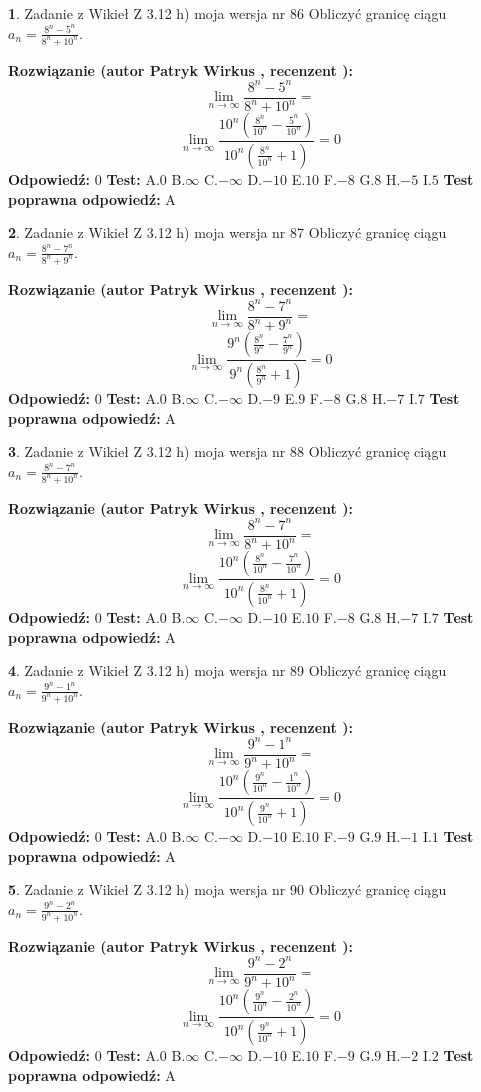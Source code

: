 \documentclass[12pt, a4paper]{article}
\theoremstyle{definition} %
\newtheorem{zad}{}
\newcommand{\zadStart}[1]{\begin{zad}#1\newline}
\newcommand{\zadStop}{\end{zad}}
\newcommand{\rozwStart}[2]{\noindent \textbf{Rozwiązanie (autor #1 , recenzent #2): }\newline}
\newcommand{\rozwStop}{\newline}
\newcommand{\odpStart}{\noindent \textbf{Odpowiedź:}\newline}
\newcommand{\odpStop}{\newline}
\newcommand{\testStart}{\noindent \textbf{Test:}\newline}
\newcommand{\testStop}{\newline}
\newcommand{\kluczStart}{\noindent \textbf{Test poprawna odpowiedź:}\newline}
\newcommand{\kluczStop}{\newline}
\begin{document}
\zadStart{Zadanie z Wikieł Z 3.12 h) moja wersja nr 86}
Obliczyć granicę ciągu $a_{n}=\frac{8^{n} - 5^{n}}{8^{n} + 10^{n}}$.
\zadStop
\rozwStart{Patryk Wirkus}{}
$$\lim\limits_{n\to\infty}\frac{8^{n} - 5^{n}}{8^{n} + 10^{n}}=$$
$$\lim\limits_{n\to\infty}\frac{10^{n}(\frac{8^{n}}{10^{n}} - \frac{5^{n}}{10^{n}})}{10^{n}(\frac{8^{n}}{10^{n}} + 1)} = 0$$
\rozwStop
\odpStart
$0$
\odpStop
\testStart
A.$0$
B.$\infty$
C.$-\infty$
D.$-10$
E.$10$
F.$-8$
G.$8$
H.$-5$
I.$5$
\testStop
\kluczStart
A
\kluczStop



\zadStart{Zadanie z Wikieł Z 3.12 h) moja wersja nr 87}
Obliczyć granicę ciągu $a_{n}=\frac{8^{n} - 7^{n}}{8^{n} + 9^{n}}$.
\zadStop
\rozwStart{Patryk Wirkus}{}
$$\lim\limits_{n\to\infty}\frac{8^{n} - 7^{n}}{8^{n} + 9^{n}}=$$
$$\lim\limits_{n\to\infty}\frac{9^{n}(\frac{8^{n}}{9^{n}} - \frac{7^{n}}{9^{n}})}{9^{n}(\frac{8^{n}}{9^{n}} + 1)} = 0$$
\rozwStop
\odpStart
$0$
\odpStop
\testStart
A.$0$
B.$\infty$
C.$-\infty$
D.$-9$
E.$9$
F.$-8$
G.$8$
H.$-7$
I.$7$
\testStop
\kluczStart
A
\kluczStop



\zadStart{Zadanie z Wikieł Z 3.12 h) moja wersja nr 88}
Obliczyć granicę ciągu $a_{n}=\frac{8^{n} - 7^{n}}{8^{n} + 10^{n}}$.
\zadStop
\rozwStart{Patryk Wirkus}{}
$$\lim\limits_{n\to\infty}\frac{8^{n} - 7^{n}}{8^{n} + 10^{n}}=$$
$$\lim\limits_{n\to\infty}\frac{10^{n}(\frac{8^{n}}{10^{n}} - \frac{7^{n}}{10^{n}})}{10^{n}(\frac{8^{n}}{10^{n}} + 1)} = 0$$
\rozwStop
\odpStart
$0$
\odpStop
\testStart
A.$0$
B.$\infty$
C.$-\infty$
D.$-10$
E.$10$
F.$-8$
G.$8$
H.$-7$
I.$7$
\testStop
\kluczStart
A
\kluczStop



\zadStart{Zadanie z Wikieł Z 3.12 h) moja wersja nr 89}
Obliczyć granicę ciągu $a_{n}=\frac{9^{n} - 1^{n}}{9^{n} + 10^{n}}$.
\zadStop
\rozwStart{Patryk Wirkus}{}
$$\lim\limits_{n\to\infty}\frac{9^{n} - 1^{n}}{9^{n} + 10^{n}}=$$
$$\lim\limits_{n\to\infty}\frac{10^{n}(\frac{9^{n}}{10^{n}} - \frac{1^{n}}{10^{n}})}{10^{n}(\frac{9^{n}}{10^{n}} + 1)} = 0$$
\rozwStop
\odpStart
$0$
\odpStop
\testStart
A.$0$
B.$\infty$
C.$-\infty$
D.$-10$
E.$10$
F.$-9$
G.$9$
H.$-1$
I.$1$
\testStop
\kluczStart
A
\kluczStop



\zadStart{Zadanie z Wikieł Z 3.12 h) moja wersja nr 90}
Obliczyć granicę ciągu $a_{n}=\frac{9^{n} - 2^{n}}{9^{n} + 10^{n}}$.
\zadStop
\rozwStart{Patryk Wirkus}{}
$$\lim\limits_{n\to\infty}\frac{9^{n} - 2^{n}}{9^{n} + 10^{n}}=$$
$$\lim\limits_{n\to\infty}\frac{10^{n}(\frac{9^{n}}{10^{n}} - \frac{2^{n}}{10^{n}})}{10^{n}(\frac{9^{n}}{10^{n}} + 1)} = 0$$
\rozwStop
\odpStart
$0$
\odpStop
\testStart
A.$0$
B.$\infty$
C.$-\infty$
D.$-10$
E.$10$
F.$-9$
G.$9$
H.$-2$
I.$2$
\testStop
\kluczStart
A
\kluczStop
\end{document}
